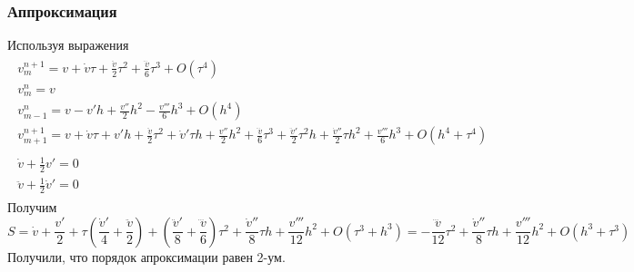 \documentclass[a4paper,12pt]{article}
\begin{document}
\subsubsection{Аппроксимация}
Используя выражения
\begin{align*}
\begin{array}{l}
    v_m^{n+1}=v+\dot v \tau+\frac{\ddot v}{2} {\tau}^2+\frac{\dddot v}6{\tau}^3+O({\tau}^4)\\
    v_m^n=v\\
    v^n_{m-1}=v-v' h+\frac{v''}2 h^2-\frac{v'''}6 h^3 +O(h^4)\\
    v^{n+1}_{m+1}=v+\dot v \tau +v' h +\frac{\ddot v}{2} \tau^2 + \dot v' \tau h + \frac{v''}{2} h^2 + \frac{\dddot v}{6} \tau^3 + \frac{\ddot v'}{2} \tau^2 h +\frac{\dot v''}{2}\tau h^2+\frac{v'''}{6} h^3+ O(h^4+\tau^4)   \\
    \\
    \dot v +\frac12v'=0\\
    \ddot v+\frac12\dot v'=0
\end{array}
\end{align*}
Получим
\[
    S=\dot v +\frac{v'}2+\tau(\frac{\dot v'}4+\frac{ \ddot v}2)+(\frac{\ddot v'}8+\frac{\dddot v}6)\tau^2+\frac{\dot v''}8\tau h+\frac{v'''}{12}h^2+O(\tau^3+h^3)=-\frac{\dddot v}{12} \tau^2+\frac{\dot v''}{8}\tau h+\frac{v'''}{12}h^2+O(h^3+\tau^3)
\]
Получили, что порядок апроксимации равен 2-ум.
\end{document}

